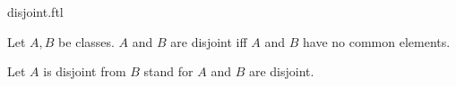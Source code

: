 \documentclass{article}
\begin{document}
\begin{smodule}[creators={Marcel Schütz}]{disjoint.ftl}

  \begin{fdefinition*}[label=4981913324355584]
    Let $A, B$ be classes.
    $A$ and $B$ are disjoint iff $A$ and $B$ have no common elements.
  \end{fdefinition*}

  \begin{fconvention*}
    Let $A$ is disjoint from $B$ stand for $A$ and $B$ are disjoint.
  \end{fconvention*}
\end{smodule}
\end{document}
